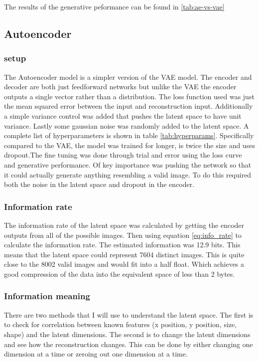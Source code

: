 \documentclass[conference,a4paper]{IEEEtran}
\begin{document}
The results of the generative peformance can be found in \ref{tab:ae-vs-vae}

\subsection{Autoencoder}

\subsubsection{setup}

The Autoencoder model is a simpler version of the VAE model. The encoder and decoder are both just feedforward networks but unlike the VAE the encoder outputs a single vector rather than a distribution. The loss function used was just the mean squared error between the input and reconstruction input. Additionally a simple variance control was added that pushes the latent space to have unit variance. Lastly some gaussian noise was randomly added to the latent space. A complete list of hyperparameters is shown in table \ref{tab:hyperparams}. Specifically compared to the VAE, the model was trained for longer, is twice the size and uses dropout.The fine tuning was done through trial and error using the loss curve and generative performance. Of key importance was pushing the network so that it could actually generate anything resembling a valid image. To do this required both the noise in the latent space and dropout in the encoder.

\subsubsection{Information rate}

The information rate of the latent space was calculated by getting the encoder outputs from all of the possible images. Then using equation \ref{eq:info_rate} to calculate the information rate. The estimated information was 12.9 bits. This means that the latent space could represent 7604 distinct images. This is quite close to the 8002 valid images and would fit into a half float. Which achieves a good compression of the data into the equivalent space of less than 2 bytes.

\subsubsection{Information meaning}

There are two methods that I will use to understand the latent space. The first is to check for correlation between known features (x position, y position, size, shape) and the latent dimensions. The second is to change the latent dimensions and see how the reconstruction changes. This can be done by either changing one dimension at a time or zeroing out one dimension at a time.
\end{document}
